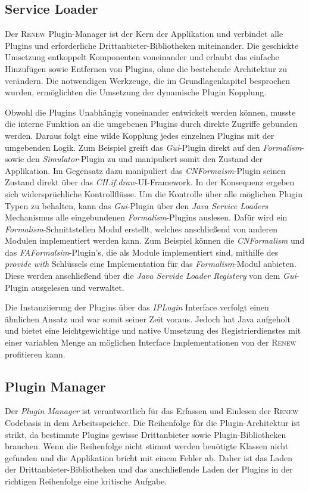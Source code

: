 	\subsection{Service Loader} 
		Der \textsc{Renew} Plugin-Manager ist der Kern der Applikation und verbindet alle Plugins und erforderliche Drittanbieter-Bibliotheken miteinander. Die geschickte Umsetzung entkoppelt Komponenten voneinander und erlaubt das einfache Hinzufügen sowie Entfernen von Plugins, ohne die bestehende Architektur zu verändern. Die notwendigen Werkzeuge, die im Grundlagenkapitel besprochen wurden, ermöglichten die Umsetzung der dynamische Plugin Kopplung. \bigbreak

		Obwohl die Plugins Unabhängig voneinander entwickelt werden können, musste die interne Funktion an die umgebenen Plugins durch direkte Zugriffe gebunden werden. Daraus folgt eine wilde Kopplung jedes einzelnen Plugins mit der umgebenden Logik. Zum Beispiel greift das \textit{Gui}-Plugin direkt auf den \textit{Formalism}- sowie den \textit{Simulator}-Plugin zu und manipuliert somit den Zustand der Applikation. Im Gegensatz dazu manipuliert das \textit{CNFormaism}-Plugin seinen Zustand direkt über das \textit{CH.if.draw}-UI-Framework. In der Konsequenz ergeben sich widersprüchliche Kontrollflüsse.\newline  
		Um die Kontrolle über alle möglichen Plugin Typen zu behalten, kann das \textit{Gui}-Plugin über den \textit{Java Service Loaders} Mechanismus alle eingebundenen \textit{Formalism}-Plugins auslesen. Dafür wird ein \textit{Formalism}-Schnittstellen Modul erstellt, welches anschließend von anderen Modulen implementiert werden kann. Zum Beispiel können die \textit{CNFormalism} und das \textit{FAFormalsim}-Plugin's, die als Module implementiert sind, mithilfe des \textit{provide with} Schlüssels eine Implementation für das \textit{Formalism}-Modul anbieten. Diese werden anschließend über die \textit{Java Servide Loader Registery} von dem \textit{Gui}-Plugin ausgelesen und verwaltet. \bigbreak

		Die Instanziierung der Plugins über das \textit{IPLugin} Interface verfolgt einen ähnlichen Ansatz und war somit seiner Zeit voraus. Jedoch hat Java aufgeholt und bietet eine leichtgewichtige und native Umsetzung des Registrierdienstes mit einer variablen Menge an möglichen Interface Implementationen von der \textsc{Renew} profitieren kann.   

	\subsection{Plugin Manager}
		Der \textit{Plugin Manager} ist verantwortlich für das Erfassen und Einlesen der \textsc{Renew} Codebasis in dem Arbeitsspeicher. Die Reihenfolge für die Plugin-Architektur ist strikt, da bestimmte Plugins gewisse Drittanbieter sowie Plugin-Bibliotheken brauchen. Wenn die Reihenfolge nicht stimmt werden benötigte Klassen nicht gefunden und die Applikation bricht mit einem Fehler ab. Daher ist das Laden der Drittanbieter-Bibliotheken und das anschließende Laden der Plugins in der richtigen Reihenfolge eine kritische Aufgabe. \bigbreak

